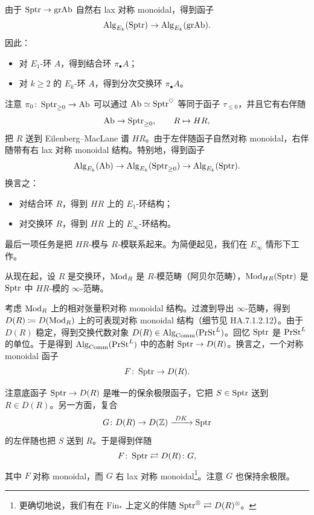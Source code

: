 \begin{construction}\label{L27-3.2}
由于 $\operatorname{Sptr}\to\mathrm{grAb}$ 自然右 lax 对称 monoidal，得到函子
\[
\operatorname{Alg}_{E_k}(\operatorname{Sptr})\to\operatorname{Alg}_{E_k}(\mathrm{grAb}).
\]
因此：
\begin{itemize}[leftmargin=2.2em,itemsep=0.1em]
\item 对 $E_{1}$-环 $A$，得到结合环 $\pi_{\bullet}A$；
\item 对 $k\ge 2$ 的 $E_{k}$-环 $A$，得到分次交换环 $\pi_{\bullet}A$。
\end{itemize}
\end{construction}

\begin{construction}\label{L27-3.3}
注意 $\pi_{0}\colon\operatorname{Sptr}_{\ge 0}\to\operatorname{Ab}$ 可以通过 $\operatorname{Ab}\simeq\operatorname{Sptr}^{\heartsuit}$ 等同于函子 $\tau_{\le 0}$，并且它有右伴随
\[
\operatorname{Ab}\to\operatorname{Sptr}_{\ge 0},\qquad R\mapsto HR,
\]
把 $R$ 送到 Eilenberg--MacLane 谱 $HR$。由于左伴随函子自然对称 monoidal，右伴随带有右 lax 对称 monoidal 结构。特别地，得到函子
\[
\operatorname{Alg}_{E_k}(\operatorname{Ab})\to\operatorname{Alg}_{E_k}(\operatorname{Sptr}_{\ge 0})\to\operatorname{Alg}_{E_k}(\operatorname{Sptr}).
\]
换言之：
\begin{itemize}[leftmargin=2.2em,itemsep=0.1em]
\item 对结合环 $R$，得到 $HR$ 上的 $E_{1}$-环结构；
\item 对交换环 $R$，得到 $HR$ 上的 $E_{\infty}$-环结构。
\end{itemize}
\end{construction}

\nitem\label{L27-3.4}
最后一项任务是把 $HR$-模与 $R$-模联系起来。为简便起见，我们在 $E_{\infty}$ 情形下工作。

从现在起，设 $R$ 是交换环，$\operatorname{Mod}_{R}$ 是 $R$-模范畴（阿贝尔范畴），$\operatorname{Mod}_{HR}(\operatorname{Sptr})$ 是 $\operatorname{Sptr}$ 中 $HR$-模的 $\infty$-范畴。

\begin{construction}\label{L27-3.5}
考虑 $\operatorname{Mod}_{R}$ 上的相对张量积对称 monoidal 结构。过渡到导出 $\infty$-范畴，得到 $D(R)\coloneqq D(\operatorname{Mod}_{R})$ 上的可表现对称 monoidal 结构（细节见 HA.7.1.2.12）。由于 $D(R)$ 稳定，得到交换代数对象 $D(R)\in\operatorname{Alg}_{\mathrm{Comm}}(\operatorname{PrSt}^{L})$。回忆 $\operatorname{Sptr}$ 是 $\operatorname{PrSt}^{L}$ 的单位。于是得到 $\operatorname{Alg}_{\mathrm{Comm}}(\operatorname{PrSt}^{L})$ 中的态射 $\operatorname{Sptr}\to D(R)$。换言之，一个对称 monoidal 函子
\[
F\colon\operatorname{Sptr}\to D(R).
\]
\end{construction}

\nitem\label{L27-3.6}
注意底函子 $\operatorname{Sptr}\to D(R)$ 是唯一的保余极限函子，它把 $S\in\operatorname{Sptr}$ 送到 $R\in D(R)$。另一方面，复合
\[
G\colon D(R)\to D(\Z)\xrightarrow{\ DK\ }\Sptr
\]
的左伴随也把 $S$ 送到 $R$。于是得到伴随
\[
F\colon\operatorname{Sptr}\rightleftarrows D(R)\colon G,
\]
其中 $F$ 对称 monoidal，而 $G$ 右 lax 对称 monoidal\footnote{更确切地说，我们有在 $\mathrm{Fin}_{*}$ 上定义的伴随 $\operatorname{Sptr}^{\otimes}\rightleftarrows D(R)^{\otimes}$。}。注意 $G$ 也保持余极限。

